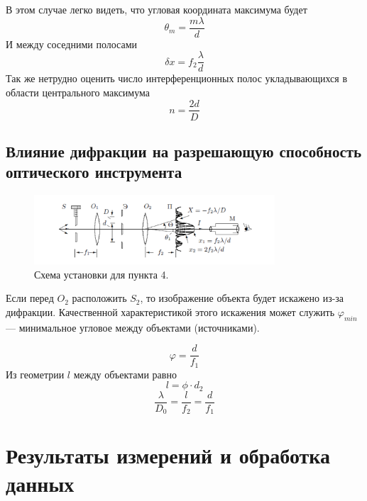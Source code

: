 \documentclass[a4paper, 12pt]{article}%
\begin{document}
В этом случае легко видеть, что угловая координата максимума будет 
\begin{equation}
\theta_m = \frac{m \lambda}{d}
\end{equation}
И между соседними полосами 
\begin{equation}
\delta x = f_2 \frac{\lambda}{d}
\end{equation}
Так же нетрудно оценить число интерференционных полос укладывающихся в области центрального максимума 
\begin{equation}
n = \frac{2d}{D}
\end{equation}


\subsection{Влияние дифракции на разрешающую способность оптического инструмента}

\begin{figure}[h]
\begin{center}
\includegraphics[width = 0.8\textwidth]{pics/5.png}
\caption{Схема установки для пункта 4.}
\end{center}
\end{figure}

Если перед $O_2$ расположить $S_2$, то изображение объекта будет искажено из-за дифракции. Качественной характеристикой этого искажения может служить $\varphi_{min}$ --- минимальное угловое между объектами (источниками). 

\begin{equation}
\varphi = \frac{d}{f_1}
\end{equation}
Из геометрии $l$ между объектами равно 
\begin{equation}
l = \phi \cdot d_2
\end{equation}
\begin{equation}
\dfrac{\lambda}{D_0} = \dfrac{l}{f_2} = \dfrac{d}{f_1}
\end{equation}

\newpage
\section{Результаты измерений и обработка данных}
\end{document}
